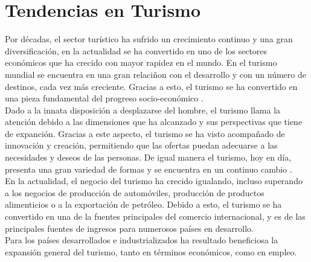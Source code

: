 \section{Tendencias en Turismo}

Por décadas, el sector turístico ha sufrido un crecimiento continuo y una gran diversificación, en la actualidad se ha convertido en uno de los sectores económicos que ha crecido con mayor rapidez en el mundo. En el turismo mundial se encuentra en una gran relaciñon con el desarrollo y con un número de destinos, cada vez más creciente. Gracias a esto, el turismo se ha convertido en una pieza fundamental del progreso socio-económico \cite{turismo}.\\

Dado a la innata disposición a desplazarse del hombre, el turismo llama la atención debido a las dimensiones que ha alcanzado y sus perspectivas que tiene de expanción. Gracias a este aspecto, el turismo se ha visto acompañado de innovación y creación, permitiendo que las ofertas puedan adecuarse a las necesidades y deseos de las personas. De igual manera el turismo, hoy en día, presenta una gran variedad de formas y se encuentra en un continuo cambio \cite{realidadTurismo}. \\

En la actualidad, el negocio del turismo ha crecido igualando, incluso superando a los negocios de producción de automóviles, producción de productos alimenticios o a la exportación  de petróleo. Debido a esto, el turismo se ha convertido en una de la fuentes principales del comercio internacional, y es de las principales fuentes de ingresos para numerosos países en desarrollo.\\

Para los países desarrollados e industrializados ha resultado beneficiosa la expansión general del turismo, tanto en términos económicos, como en empleo.